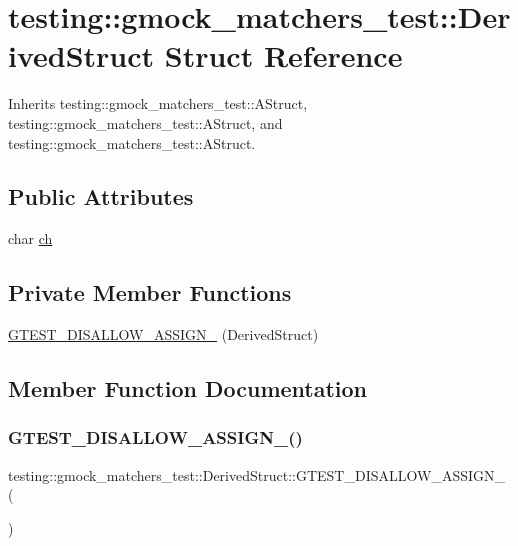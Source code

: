 \hypertarget{structtesting_1_1gmock__matchers__test_1_1_derived_struct}{}\section{testing\+::gmock\+\_\+matchers\+\_\+test\+::Derived\+Struct Struct Reference}
\label{structtesting_1_1gmock__matchers__test_1_1_derived_struct}


Inherits testing\+::gmock\+\_\+matchers\+\_\+test\+::\+A\+Struct, testing\+::gmock\+\_\+matchers\+\_\+test\+::\+A\+Struct, and testing\+::gmock\+\_\+matchers\+\_\+test\+::\+A\+Struct.

\subsection*{Public Attributes}
\begin{DoxyCompactItemize}
\item 
char \mbox{\hyperlink{structtesting_1_1gmock__matchers__test_1_1_derived_struct_abd7de960817b2c889f109ae6f2869f4c}{ch}}
\end{DoxyCompactItemize}
\subsection*{Private Member Functions}
\begin{DoxyCompactItemize}
\item 
\mbox{\hyperlink{structtesting_1_1gmock__matchers__test_1_1_derived_struct_a65c403c5ed3b92cfbbf758b9fe0fc479}{G\+T\+E\+S\+T\+\_\+\+D\+I\+S\+A\+L\+L\+O\+W\+\_\+\+A\+S\+S\+I\+G\+N\+\_\+}} (Derived\+Struct)
\end{DoxyCompactItemize}


\subsection{Member Function Documentation}
\mbox{\label{structtesting_1_1gmock__matchers__test_1_1_derived_struct_a65c403c5ed3b92cfbbf758b9fe0fc479}} 
\subsubsection{\texorpdfstring{GTEST\_DISALLOW\_ASSIGN\_()}{GTEST\_DISALLOW\_ASSIGN\_()}}
{\footnotesize\ttfamily testing\+::gmock\+\_\+matchers\+\_\+test\+::\+Derived\+Struct\+::\+G\+T\+E\+S\+T\+\_\+\+D\+I\+S\+A\+L\+L\+O\+W\+\_\+\+A\+S\+S\+I\+G\+N\+\_\+ (\begin{DoxyParamCaption}\item[{Derived\+Struct}]{ }\end{DoxyParamCaption})\hspace{0.3cm}{\ttfamily [private]}}



